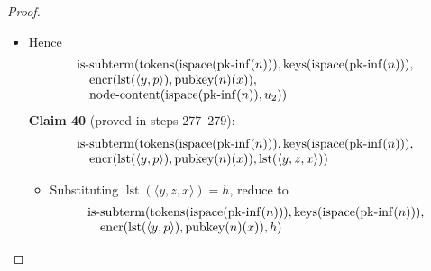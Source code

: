 \documentclass[11pt]{article}
\theoremstyle{plain}
\begin{document}
\begin{proof}
\begin{itemize}[leftmargin=2.8em, itemsep=4pt, parsep=1pt]
\begin{itemize}[leftmargin=2.8em, itemsep=4pt, parsep=1pt]
  \item[\textbf{275--276}] Hence 
\begin{equation*}
\begin{array}{@{}l@{}}
\begin{array}{@{}l@{}} \operatorname{is\text{-}subterm}(\operatorname{tokens}(\operatorname{ispace}(\operatorname{pk\text{-}inf}(n))), \operatorname{keys}(\operatorname{ispace}(\operatorname{pk\text{-}inf}(n))), \\ \quad \operatorname{encr}(\operatorname{lst}(\langle y, p \rangle), \operatorname{pubkey}(n)(x)), \\ \quad \operatorname{node\text{-}content}(\operatorname{ispace}(\operatorname{pk\text{-}inf}(n)), u_{2})) \end{array}
\end{array}
\end{equation*}
\textbf{Claim 40} (proved in steps 277--279):
\begin{equation*}
\begin{array}{@{}l@{}} \operatorname{is\text{-}subterm}(\operatorname{tokens}(\operatorname{ispace}(\operatorname{pk\text{-}inf}(n))), \operatorname{keys}(\operatorname{ispace}(\operatorname{pk\text{-}inf}(n))), \\ \quad \operatorname{encr}(\operatorname{lst}(\langle y, p \rangle), \operatorname{pubkey}(n)(x)), \operatorname{lst}(\langle y, z, x \rangle)) \end{array}
\end{equation*}

  \begin{itemize}[leftmargin=2.8em, itemsep=4pt, parsep=1pt]
  \item[\textbf{277}] Substituting $\operatorname{lst}(\langle y, z, x \rangle) = h$, reduce to
\begin{equation*}
\begin{array}{@{}l@{}} \operatorname{is\text{-}subterm}(\operatorname{tokens}(\operatorname{ispace}(\operatorname{pk\text{-}inf}(n))), \operatorname{keys}(\operatorname{ispace}(\operatorname{pk\text{-}inf}(n))), \\ \quad \operatorname{encr}(\operatorname{lst}(\langle y, p \rangle), \operatorname{pubkey}(n)(x)), h) \end{array}
\end{equation*}


\end{itemize}
\end{itemize}
\end{itemize}
\end{proof}
\end{document}
